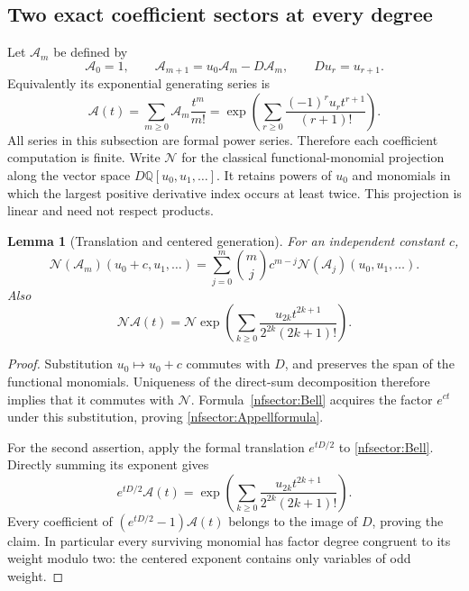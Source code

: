 \documentclass[11pt,a4paper]{article}
\numberwithin{equation}{section}
\newtheorem{lemma}[theorem]{Lemma}
\theoremstyle{definition}
\theoremstyle{remark}
\begin{document}


\subsection{Two exact coefficient sectors at every degree}
\label{nfsector:section}

Let $\mathcal A_m$ be defined by
\[
 \mathcal A_0=1,\qquad
 \mathcal A_{m+1}=u_0\mathcal A_m-D\mathcal A_m,
 \qquad D u_r=u_{r+1}.
\]
Equivalently its exponential generating series is
\begin{equation}\label{nfsector:Bell}
 \mathcal A(t)=\sum_{m\ge0}\mathcal A_m\frac{t^m}{m!}
 =\exp\left(\sum_{r\ge0}
       \frac{(-1)^r u_r t^{r+1}}{(r+1)!}\right).
\end{equation}
All series in this subsection are formal power series.  Therefore each
coefficient computation is finite.  Write $\mathcal N$ for the classical
functional-monomial projection along the vector space $D\mathbb Q[u_0,u_1,\ldots]$.
It retains powers of $u_0$ and monomials in which the largest positive
derivative index occurs at least twice.  This projection is linear and
need not respect products.

\begin{lemma}[Translation and centered generation]\label{nfsector:Appell}
For an independent constant $c$,
\begin{equation}\label{nfsector:Appellformula}
 \mathcal N(\mathcal A_m)(u_0+c,u_1,\ldots)
 =\sum_{j=0}^m\binom mj c^{m-j}\mathcal N(\mathcal A_j)(u_0,u_1,\ldots).
\end{equation}
Also
\begin{equation}\label{nfsector:centered}
 \mathcal N\mathcal A(t)
 =\mathcal N\exp\left(\sum_{k\ge0}
       \frac{u_{2k}t^{2k+1}}{2^{2k}(2k+1)!}\right).
\end{equation}
\end{lemma}
\begin{proof}
Substitution $u_0\mapsto u_0+c$ commutes with $D$, and preserves the
span of the functional monomials.  Uniqueness of the direct-sum
decomposition therefore implies that it commutes with $\mathcal N$.
Formula~\eqref{nfsector:Bell} acquires the factor $e^{ct}$ under this
substitution, proving \eqref{nfsector:Appellformula}.

For the second assertion, apply the formal translation $e^{tD/2}$
to \eqref{nfsector:Bell}.  Directly summing its exponent gives
\[
 e^{tD/2}\mathcal A(t)
 =\exp\left(\sum_{k\ge0}
       \frac{u_{2k}t^{2k+1}}{2^{2k}(2k+1)!}\right).
\]
Every coefficient of $(e^{tD/2}-1)\mathcal A(t)$ belongs to the image
of $D$, proving the claim.  In particular every surviving monomial
has factor degree congruent to its weight modulo two: the centered
exponent contains only variables of odd weight.
\end{proof}
\end{document}
